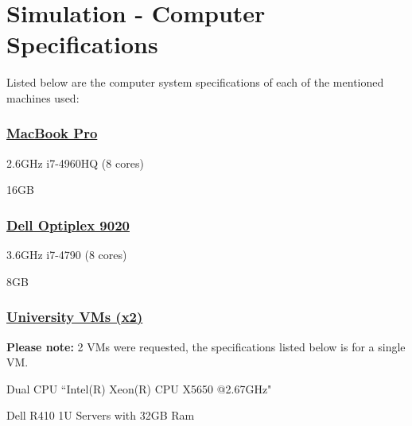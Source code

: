 \section{Simulation - Computer Specifications}\label{sec:power}
Listed below are the computer system specifications of each of the mentioned machines used:
\subsubsection{\underline{MacBook Pro}}
\begin{description}[leftmargin=8em,style=nextline]
  \item[Processor] 2.6GHz i7-4960HQ (8 cores)
  \item[RAM] 16GB
\end{description}

\subsubsection{\underline{Dell Optiplex 9020}}
\begin{description}[leftmargin=8em,style=nextline]
  \item[Processor] 3.6GHz i7-4790 (8 cores)
  \item[RAM] 8GB
\end{description}

\subsubsection{\underline{University VMs (x2)}}
\textbf{Please note:} 2 VMs were requested, the specifications listed below is for a single VM.
\begin{description}[leftmargin=8em,style=nextline]
  \item[Processor] Dual CPU ``Intel(R) Xeon(R) CPU X5650 @2.67GHz"
  \item[RAM] Dell R410 1U Servers with 32GB Ram
\end{description}
